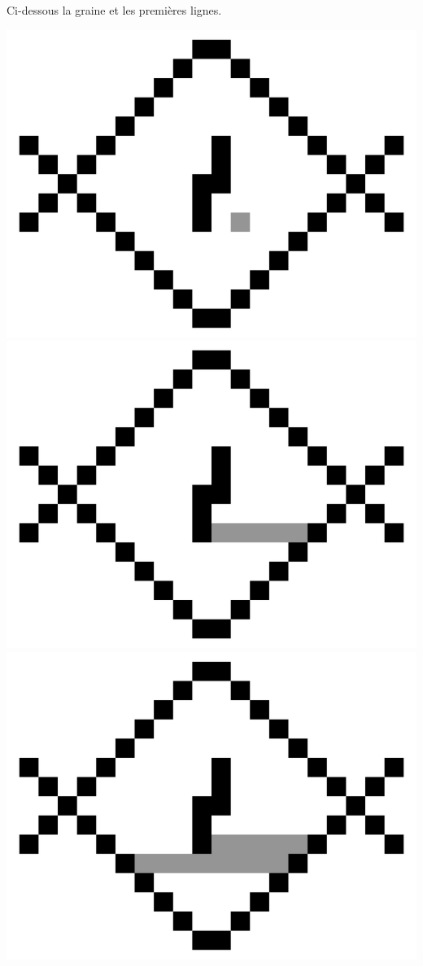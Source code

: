\documentclass[11pt,class=report,crop=false]{standalone}
\begin{document}
Ci-dessous la graine et les premières lignes.
\begin{center}
	\includegraphics[scale=\myscale,scale=0.20]{figures/fill02_000}\quad
	\includegraphics[scale=\myscale,scale=0.20]{figures/fill02_001}\quad
	\includegraphics[scale=\myscale,scale=0.20]{figures/fill02_002}\quad

\end{center}
\end{document}
